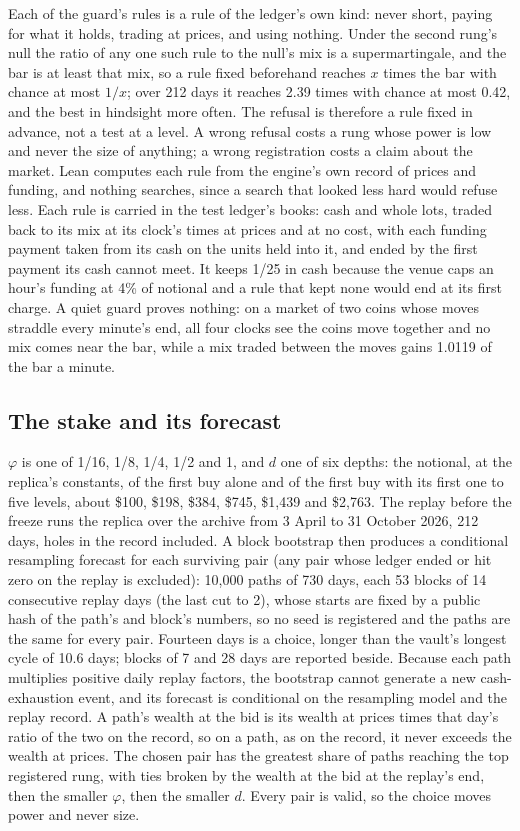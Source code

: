 \documentclass[11pt]{article}
\begin{document}
Each of the guard's rules is a rule of the ledger's own kind: never short, paying for what it holds, trading at prices, and using nothing. Under the second rung's null the ratio of any one such rule to the null's mix is a supermartingale, and the bar is at least that mix, so a rule fixed beforehand reaches $x$ times the bar with chance at most $1/x$; over 212 days it reaches 2.39 times with chance at most 0.42, and the best in hindsight more often. The refusal is therefore a rule fixed in advance, not a test at a level. A wrong refusal costs a rung whose power is low and never the size of anything; a wrong registration costs a claim about the market. Lean computes each rule from the engine's own record of prices and funding, and nothing searches, since a search that looked less hard would refuse less. Each rule is carried in the test ledger's books: cash and whole lots, traded back to its mix at its clock's times at prices and at no cost, with each funding payment taken from its cash on the units held into it, and ended by the first payment its cash cannot meet. It keeps 1/25 in cash because the venue caps an hour's funding at 4\% of notional and a rule that kept none would end at its first charge. A quiet guard proves nothing: on a market of two coins whose moves straddle every minute's end, all four clocks see the coins move together and no mix comes near the bar, while a mix traded between the moves gains 1.0119 of the bar a minute.

\subsection{The stake and its forecast}

$\varphi$ is one of 1/16, 1/8, 1/4, 1/2 and 1, and $d$ one of six depths: the notional, at the replica's constants, of the first buy alone and of the first buy with its first one to five levels, about \$100, \$198, \$384, \$745, \$1{,}439 and \$2{,}763. The replay before the freeze runs the replica over the archive from 3 April to 31 October 2026, 212 days, holes in the record included. A block bootstrap then produces a conditional resampling forecast for each surviving pair (any pair whose ledger ended or hit zero on the replay is excluded): 10{,}000 paths of 730 days, each 53 blocks of 14 consecutive replay days (the last cut to 2), whose starts are fixed by a public hash of the path's and block's numbers, so no seed is registered and the paths are the same for every pair. Fourteen days is a choice, longer than the vault's longest cycle of 10.6 days; blocks of 7 and 28 days are reported beside. Because each path multiplies positive daily replay factors, the bootstrap cannot generate a new cash-exhaustion event, and its forecast is conditional on the resampling model and the replay record. A path's wealth at the bid is its wealth at prices times that day's ratio of the two on the record, so on a path, as on the record, it never exceeds the wealth at prices. The chosen pair has the greatest share of paths reaching the top registered rung, with ties broken by the wealth at the bid at the replay's end, then the smaller $\varphi$, then the smaller $d$. Every pair is valid, so the choice moves power and never size.
\end{document}

